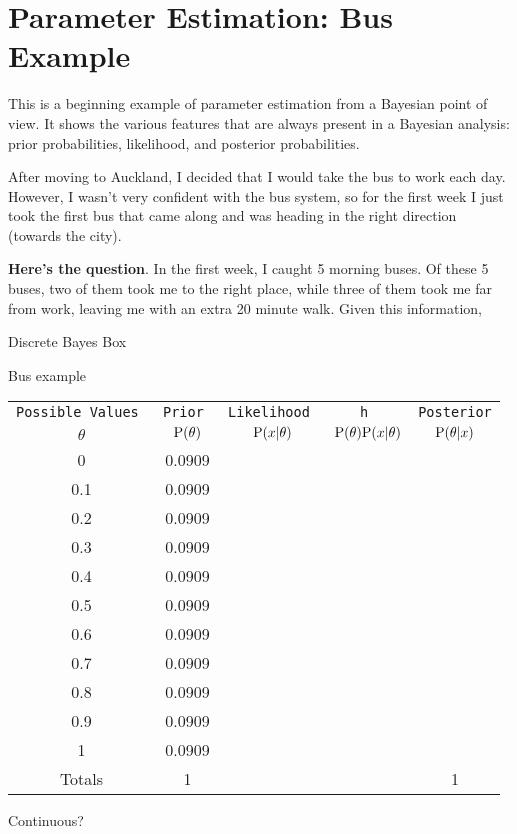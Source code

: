\section{Parameter Estimation: Bus Example}
This is a beginning example of parameter estimation from a Bayesian point of
view. It shows the various features that are always present in a Bayesian
analysis: prior probabilities, likelihood, and posterior probabilities.

After moving to Auckland, I decided that I would take the bus to work
each day. However, I wasn't very confident with the bus system, so for the first
week I just took the first bus that came along and was heading in the right
direction (towards the city).

{\bf Here's the question}. In the first week, I caught 5 morning buses.
Of these 5 buses, two of them took me to the right place, while three of them
took me far from work, leaving me with an extra 20 minute walk. Given this
information, 




Discrete
Bayes Box

Bus example

\begin{table}
\begin{center}
\begin{tabular}{|c|c|c|c|c|}
\hline
\tt{Possible Values} & \tt{Prior} & \tt{Likelihood} & \tt{h} & \tt{Posterior}\\
$\theta$ & $\textnormal{P}(\theta)$ & $\textnormal{P}(x|\theta)$ & $\textnormal{P}(\theta)\textnormal{P}(x|\theta)$ & $\textnormal{P}(\theta|x)$\\
\hline
0 & 0.0909 & & &\\
0.1 & 0.0909 & & &\\
0.2 & 0.0909 & & &\\
0.3 & 0.0909 & & &\\
0.4 & 0.0909 & & &\\
0.5 & 0.0909 & & &\\
0.6 & 0.0909 & & &\\
0.7 & 0.0909 & & &\\
0.8 & 0.0909 & & &\\
0.9 & 0.0909 & & &\\
1 & 0.0909 & & &\\
\hline
Totals & 1 & & & 1\\
\hline
\end{tabular}
\end{center}
\end{table}

Continuous?


